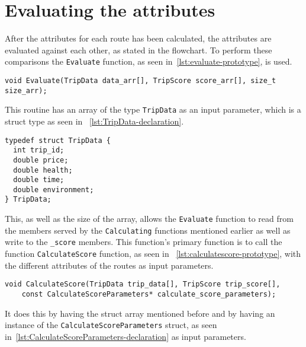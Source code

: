 \section{Evaluating the attributes}\label{sec:evaluating-the-attributes}

After the attributes for each route has been calculated, the attributes are evaluated against each other, as stated in
the flowchart.
To perform these comparisons the \texttt{Evaluate} function, as seen in~\ref{lst:evaluate-prototype}, is used.

\begin{lstlisting}[caption={Function prototype for \texttt{Evaluate}}, label={lst:evaluate-prototype}, captionpos=b]
void Evaluate(TripData data_arr[], TripScore score_arr[], size_t size_arr);
\end{lstlisting}

This routine has an array of the type \texttt{TripData} as an input parameter, which is a struct type as seen in
~\ref{lst:TripData-declaration}.

\begin{lstlisting}[caption={Declaration of \texttt{TripData} struct}, label={lst:TripData-declaration}, captionpos=b]
typedef struct TripData {
  int trip_id;
  double price;
  double health;
  double time;
  double environment;
} TripData;
\end{lstlisting}

This, as well as the size of the array, allows the \texttt{Evaluate} function to read from the members served by the
\texttt{Calculating} functions mentioned earlier as well as write to the \texttt{\_score} members.
This function's primary function is to call the function \texttt{CalculateScore} function, as seen in
~\ref{lst:calculatescore-prototype}, with the different attributes of the routes as input parameters.

\begin{lstlisting}[caption={Function prototype for \texttt{CalculateScore}},label={lst:calculatescore-prototype},
    captionpos=b]
void CalculateScore(TripData trip_data[], TripScore trip_score[],
    const CalculateScoreParameters* calculate_score_parameters);
\end{lstlisting}

It does this by having the struct array mentioned before and by having an instance of the
\texttt{CalculateScoreParameters} struct, as seen in~\ref{lst:CalculateScoreParameters-declaration} as input parameters.

